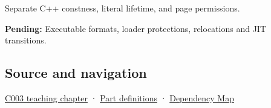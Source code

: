 Separate C++ constness, literal lifetime, and page permissions.

\textbf{Pending:} Executable formats, loader protections, relocations and JIT transitions.

\subsection{Source and navigation}\label{appendix-5f9e5e2f0a5e-source-and-navigation}

\hyperref[01-foundations-i-ch002-where-the-bytes-live]{C003 teaching chapter} · \hyperref[appendix-fd090d982a15-m003---parts-41-60]{Part definitions} · \hyperref[appendix-4ad47bdd269a]{Dependency Map}
